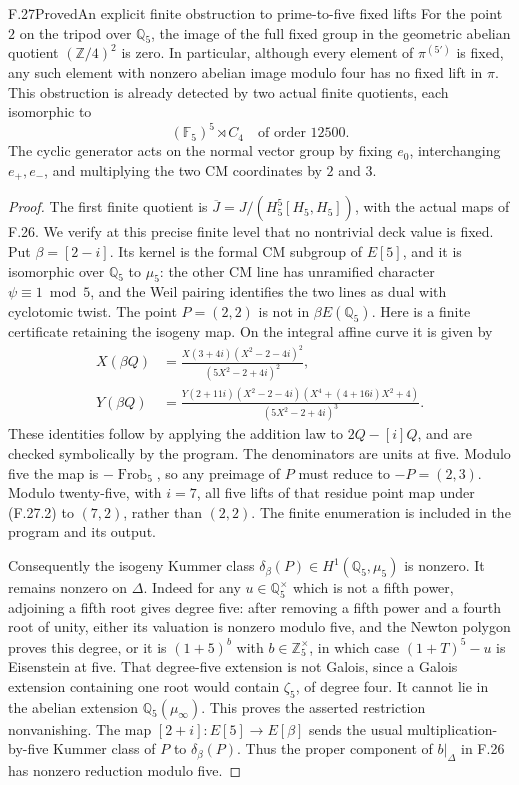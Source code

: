 \begin{statement}{F.27}{Proved}{An explicit finite obstruction to prime-to-five fixed lifts}
For the point $2$ on the tripod over $\mathbb Q_5$, the
image of the full fixed group in the geometric abelian
quotient $(\mathbb Z/4)^2$ is zero.
In particular, although every element of
$\pi^{(5')}$ is fixed, any such element with nonzero
abelian image modulo four has no fixed lift in $\pi$.
This obstruction is already detected by two actual finite
quotients, each isomorphic to
\[
                   (\mathbb F_5)^5\rtimes C_4
                   \quad\text{of order }12500.             \tag{F.27.1}
\]
The cyclic generator acts on the normal vector group by
fixing $e_0$, interchanging $e_+,e_-$, and multiplying the
two CM coordinates by $2$ and $3$.
\end{statement}
\begin{proof}
The first finite quotient is
$\overline J=J/(H_5^5[H_5,H_5])$, with the actual maps
of F.26. We verify at this precise finite level that
no nontrivial deck value is fixed.
Put $\beta=[2-i]$. Its kernel is the formal CM subgroup
of $E[5]$, and it is isomorphic over $\mathbb Q_5$ to
$\mu_5$: the other CM line has unramified character
$\psi\equiv1\bmod5$, and the Weil pairing identifies
the two lines as dual with cyclotomic twist.
The point $P=(2,2)$ is not in $\beta E(\mathbb Q_5)$.
Here is a finite certificate retaining the isogeny map.
On the integral affine curve it is given by
\[
 \begin{split}
 X(\beta Q)&=
  \frac{X(3+4i)(X^2-2-4i)^2}{(5X^2-2+4i)^2},\\
 Y(\beta Q)&=
  \frac{Y(2+11i)(X^2-2-4i)
          (X^4+(4+16i)X^2+4)}{(5X^2-2+4i)^3}.
 \end{split}                                                \tag{F.27.2}
\]
These identities follow by applying the addition law
to $2Q-[i]Q$, and are checked symbolically by the program.
The denominators are units at five. Modulo five the map
is $-\operatorname{Frob}_5$, so any preimage of $P$ must
reduce to $-P=(2,3)$. Modulo twenty-five, with $i=7$,
all five lifts of that residue point map under (F.27.2)
to $(7,2)$, rather than $(2,2)$. The finite enumeration
is included in the program and its output.

Consequently the isogeny Kummer class
$\delta_\beta(P)\in H^1(\mathbb Q_5,\mu_5)$ is nonzero.
It remains nonzero on $\Delta$.
Indeed for any $u\in\mathbb Q_5^\times$ which is not a
fifth power, adjoining a fifth root gives degree five:
after removing a fifth power and a fourth root of unity,
either its valuation is nonzero modulo five, and the
Newton polygon proves this degree, or it is
$(1+5)^b$ with $b\in\mathbb Z_5^\times$, in which case
$(1+T)^5-u$ is Eisenstein at five.
That degree-five extension is not Galois, since a
Galois extension containing one root would contain
$\zeta_5$, of degree four.
It cannot lie in the abelian extension
$\mathbb Q_5(\mu_\infty)$.
This proves the asserted restriction nonvanishing.
The map $[2+i]:E[5]\to E[\beta]$ sends the usual
multiplication-by-five Kummer class of $P$ to
$\delta_\beta(P)$. Thus the proper component of
$b|_\Delta$ in F.26 has nonzero reduction modulo five.


\end{proof}
